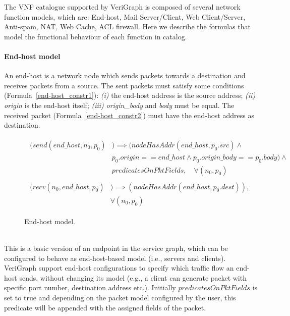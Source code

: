 
The VNF catalogue supported by VeriGraph is composed of several network function models, which are: End-host, Mail Server/Client, Web Client/Server, Anti-spam, NAT, Web Cache, ACL firewall. Here we describe the formulas that model the functional behaviour of each function in catalog.


\paragraph{End-host model}
An end-host is a network node which sends packets towards a destination and receives packets from a source. The sent packets must satisfy some conditions (Formula~\ref{end-host_constr1}): \textit{(i)} the end-host address is the source address; \textit{(ii)} \textit{origin} is the end-host itself; \textit{(iii)} \textit{origin\_body} and \textit{body}  must be equal. The received packet (Formula~\ref{end-host_constr2}) must have the end-host address as destination. 
\begin{figure}[h]
	{\footnotesize
		\begin{subequations}
			\begin{align}
				\begin{split}
					\label{end-host_constr1}
					(send(end\_host, n_{0}, p_{0}) &) \implies (nodeHasAddr(end\_host, p_{0}.src) \wedge \\
					& p_{0}.origin == end\_host \wedge p_{0}.origin\_body == p_{0}.body)  \wedge \\
					& predicatesOnPktFields, \quad   \forall (n_{0}, p_{0})
				\end{split} \\
				\begin{split}
					\label{end-host_constr2}
					(recv(n_{0}, end\_host, p_{0}) &) \implies (nodeHasAddr(end\_host, p_{0}.dest)),\\
					& \forall (n_{0}, p_{0})
				\end{split}
			\end{align}
		\end{subequations}
	}%
	\caption{End-host model.}
	\label{end-host_model}
\end{figure}
\\
This is a basic version of an endpoint in the service graph, which can be configured to behave as end-host-based model (i.e., servers and clients). VeriGraph support end-host configurations to specify which traffic flow an end-host sends, without changing its model (e.g., a client can generate packet with specific port number, destination address etc.). Initially $predicatesOnPktFields$ is set to true and depending on the packet model configured by the user, this predicate will be appended with the assigned fields of the packet. 

